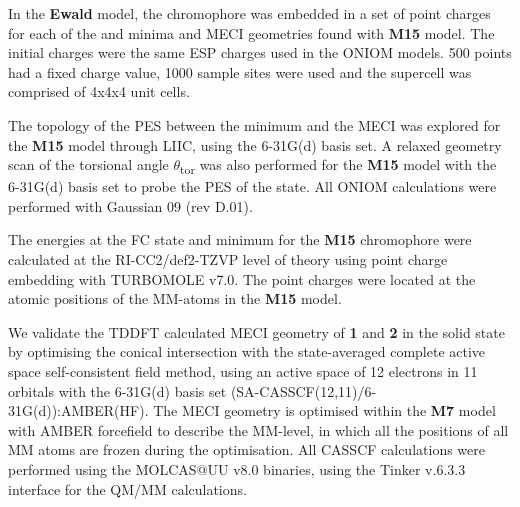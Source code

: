 In the \textbf{Ewald} model, the chromophore was embedded in a set of point charges for each of the \szero{} and \sone{} minima and MECI geometries found with \textbf{M15} model. The initial charges were the same ESP charges used in the ONIOM models. 500 points had a fixed charge value, 1000 sample sites were used and the supercell was comprised of 4x4x4 unit cells.

The topology of the PES between the \Kstar{} minimum and the MECI was explored for the \textbf{M15} model through \ac{LIIC}, using the 6-31G(d) basis set. A relaxed geometry scan of the torsional angle $\theta$\textsubscript{tor} was also performed for the \textbf{M15} model with the 6-31G(d) basis set to probe the \ac{PES} of the \Kstar{} state. All ONIOM calculations were performed with Gaussian 09 (rev D.01).\cite{g09}

The energies at the FC state and \Kstar{} minimum for the \textbf{M15} chromophore were calculated at the RI-CC2/def2-TZVP level of theory using point charge embedding with TURBOMOLE v7.0.\cite{Hattig2002,Turbomole} The point charges were located at the atomic positions of the MM-atoms in the \textbf{M15} model.

We validate the TDDFT calculated MECI geometry of \textbf{1} and \textbf{2} in the solid state by optimising the conical intersection with the state-averaged complete active space self-consistent field  method, using an active space of 12 electrons in 11 orbitals with the 6-31G(d) basis set (SA-CASSCF(12,11)/6-31G(d)):AMBER(HF). The MECI geometry is optimised within the \textbf{M7} model with AMBER forcefield to describe the MM-level, in which all the positions of all MM atoms are frozen during the optimisation. All CASSCF calculations were performed using the MOLCAS@UU v8.0 binaries, using  the Tinker v.6.3.3 interface for the QM/MM calculations. 

